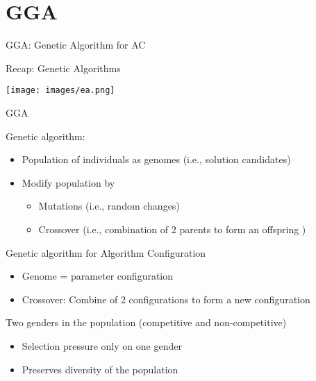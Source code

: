 

\section{GGA}

\begin{frame}[c]{GGA: Genetic Algorithm for AC}

\begin{block}{Recap: Genetic Algorithms}
\begin{center} 
	\texttt{[image: images/ea.png]}  
\end{center}
\end{block}

\end{frame}

\begin{frame}[c]{GGA~}

Genetic algorithm:
\begin{itemize}
  \item Population of individuals as genomes (i.e., solution candidates)
  \item Modify population by
  \begin{itemize}
    \item Mutations (i.e., random changes) 
    \item Crossover (i.e., combination of 2 parents to form an offspring )
  \end{itemize}
\end{itemize}

\medskip
\pause

Genetic algorithm for Algorithm Configuration
\begin{itemize}
  \item Genome = parameter configuration
  \item Crossover: Combine of 2 configurations to form a new configuration 
\end{itemize}

\medskip
\pause

Two genders in the population (competitive and non-competitive)
\begin{itemize}
  \item Selection pressure only on one gender
  \item Preserves diversity of the population 
\end{itemize}

\end{frame}

